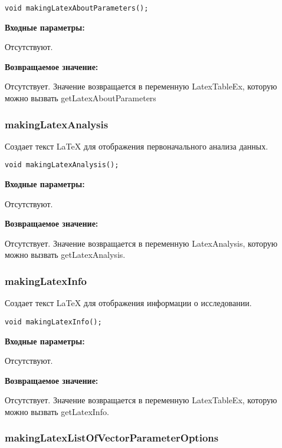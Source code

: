 \begin{lstlisting}[label=code_syntax_makingLatexAboutParameters,caption=Синтаксис]
void makingLatexAboutParameters();
\end{lstlisting}

\textbf{Входные параметры:}

Отсутствуют.

\textbf{Возвращаемое значение:}

Отсутствует. Значение возвращается в переменную LatexTableEx, которую можно вызвать getLatexAboutParameters


\subsubsection{makingLatexAnalysis}\label{makingLatexAnalysis}

Создает текст LaTeX для отображения первоначального анализа данных.


\begin{lstlisting}[label=code_syntax_makingLatexAnalysis,caption=Синтаксис]
void makingLatexAnalysis();
\end{lstlisting}

\textbf{Входные параметры:}

Отсутствуют.

\textbf{Возвращаемое значение:}

Отсутствует. Значение возвращается в переменную LatexAnalysis, которую можно вызвать getLatexAnalysis.


\subsubsection{makingLatexInfo}\label{makingLatexInfo}

Создает текст LaTeX для отображения информации о исследовании.


\begin{lstlisting}[label=code_syntax_makingLatexInfo,caption=Синтаксис]
void makingLatexInfo();
\end{lstlisting}

\textbf{Входные параметры:}

Отсутствуют.

\textbf{Возвращаемое значение:}

Отсутствует. Значение возвращается в переменную LatexTableEx, которую можно вызвать getLatexInfo.


\subsubsection{makingLatexListOfVectorParameterOptions}\label{makingLatexListOfVectorParameterOptions}

